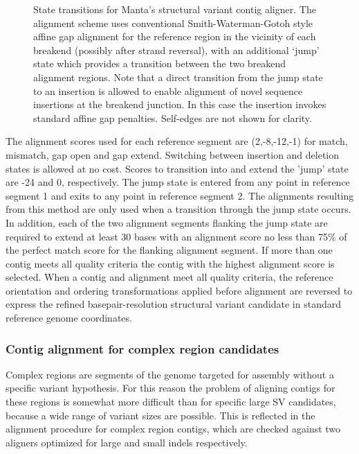 \documentclass{article}
\begin{document}
\begin{figure}[!tpb]
\centerline{
}
\caption{State transitions for Manta's structural variant contig aligner. The alignment scheme uses conventional Smith-Waterman-Gotoh style affine gap alignment for the reference region in the vicinity of each breakend (possibly after strand reversal), with an additional `jump' state which provides a transition between the two breakend alignment regions. Note that a direct transition from the jump state to an insertion is allowed to enable alignment of novel sequence insertions at the breakend junction. In this case the insertion invokes standard affine gap penalties. Self-edges are not shown for clarity.}
\label{fig:jumpstate}
\end{figure}

The alignment scores used for each reference segment are (2,-8,-12,-1) for match, mismatch, gap open and gap extend. Switching between insertion and deletion states is allowed at no cost. Scores to transition into and extend the 'jump' state are -24 and 0, respectively. The jump state is entered from any point in reference segment 1 and exits to any point in reference segment 2. The alignments resulting from this method are only used when a transition through the jump state occurs. In addition, each of the two alignment segments flanking the jump state are required to extend at least 30 bases with an alignment score no less than 75\% of the perfect match score for the flanking alignment segment. If more than one contig meets all quality criteria the contig with the highest alignment score is selected. When a contig and alignment meet all quality criteria, the reference orientation and ordering transformations applied before alignment are reversed to express the refined basepair-resolution structural variant candidate in standard reference genome coordinates.


\subsubsection{Contig alignment for complex region candidates}
Complex regions are segments of the genome targeted for assembly without a specific variant hypothesis. For this reason the problem of aligning contigs for these regions is somewhat more difficult than for specific large SV candidates, because a wide range of variant sizes are possible. This is reflected in the alignment procedure for complex region contigs, which are checked against two aligners optimized for large and small indels respectively.
\end{document}
